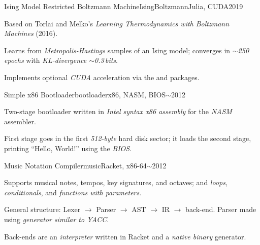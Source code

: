 \begin{project}{Ising Model Restricted Boltzmann Machine}{IsingBoltzmann}{Julia, CUDA}{2019}
    \item Based on Torlai and Melko's
        \textit{Learning Thermodynamics with Boltzmann Machines} (2016).
    \item Learns from \emph{Metropolis-Hastings} samples of an Ising model;
        converges in \emph{${\sim}$250 epochs}
        with \emph{KL-divergence ${\sim}$0.3\,bits}.
    \item Implements optional \emph{CUDA} acceleration
        via the  and  packages.
\end{project}

\begin{project}{Simple x86 Bootloader}{bootloader}{x86, NASM, BIOS}{${\sim}$2012}
    \item Two-stage bootloader written in \emph{Intel syntax x86 assembly}
        for the \emph{NASM} assembler.
    \item First stage goes in the first \emph{512-byte} hard disk sector;
        it loads the second stage,
        printing ``Hello, World!'' using the \emph{BIOS}.
\end{project}

\begin{project}{Music Notation Compiler}{music}{Racket, x86-64}{${\sim}$2012}
    \item Supports musical notes, tempos, key signatures, and octaves;
        and \emph{loops}, \emph{conditionals},
        and \emph{functions with parameters}.
    \item General structure:
        Lexer $\to$ Parser $\to$ AST $\to$ IR $\to$ back-end.
    Parser made using \emph{generator similar to YACC}.
    \item Back-ends are an \emph{interpreter} written in Racket
        and a \emph{native binary} generator.
\end{project}
